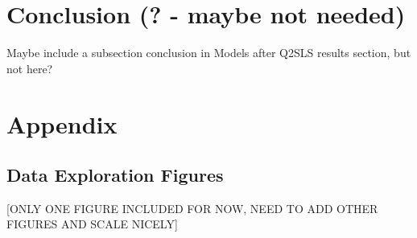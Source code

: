 \documentclass[12pt]{article}
\begin{document}
\section{Conclusion (? - maybe not needed)}
Maybe include a subsection conclusion in Models after Q2SLS results section, but not here?

\newpage
\section{Appendix}

\subsection{Data Exploration Figures} \label{appendix_figs}
\textcolor{BrickRed}{[ONLY ONE FIGURE INCLUDED FOR NOW, NEED TO ADD OTHER FIGURES AND SCALE NICELY]}
\end{document}

